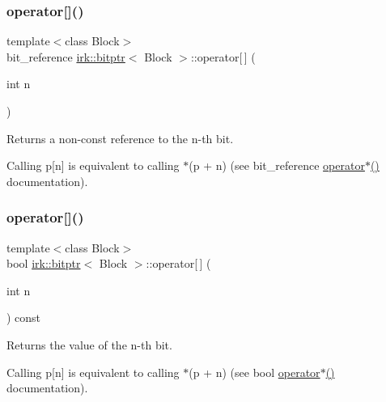 \subsubsection{\texorpdfstring{operator[]()}{operator[]()}\hspace{0.1cm}{\footnotesize\ttfamily [1/2]}}
{\footnotesize\ttfamily template$<$class Block$>$ \\
bit\+\_\+reference \mbox{\hyperlink{classirk_1_1bitptr}{irk\+::bitptr}}$<$ Block $>$\+::operator\mbox{[}$\,$\mbox{]} (\begin{DoxyParamCaption}\item[{int}]{n }\end{DoxyParamCaption})\hspace{0.3cm}{\ttfamily [inline]}}



Returns a non-\/const reference to the {\ttfamily n}-\/th bit. 

Calling p\mbox{[}n\mbox{]} is equivalent to calling $\ast$(p + n) (see {\ttfamily bit\+\_\+reference \mbox{\hyperlink{classirk_1_1bitptr_a6676fe4fc076f0cb53587ea48d8634c3}{operator$\ast$()}}} documentation). \mbox{\label{classirk_1_1bitptr_ae7ed619d650d1982a2510ca8cdd997c1}} 
\subsubsection{\texorpdfstring{operator[]()}{operator[]()}\hspace{0.1cm}{\footnotesize\ttfamily [2/2]}}
{\footnotesize\ttfamily template$<$class Block$>$ \\
bool \mbox{\hyperlink{classirk_1_1bitptr}{irk\+::bitptr}}$<$ Block $>$\+::operator\mbox{[}$\,$\mbox{]} (\begin{DoxyParamCaption}\item[{int}]{n }\end{DoxyParamCaption}) const\hspace{0.3cm}{\ttfamily [inline]}}



Returns the value of the {\ttfamily n}-\/th bit. 

Calling p\mbox{[}n\mbox{]} is equivalent to calling $\ast$(p + n) (see {\ttfamily bool \mbox{\hyperlink{classirk_1_1bitptr_a6676fe4fc076f0cb53587ea48d8634c3}{operator$\ast$()}}} documentation). \mbox{\label{classirk_1_1bitptr_a4505dc024807e2b041ffdc910fae1189}} 
